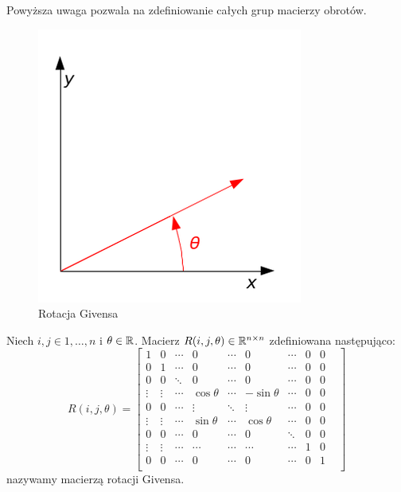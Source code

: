 \documentclass[12pt,a4paper]{report}
\newcommand{\mx}[1]{{#1}}
\begin{document}
Powyższa uwaga pozwala na zdefiniowanie całych grup macierzy obrotów.
\begin{figure}
\centering
\includegraphics[width=\linewidth]{rys/givens_rot.png}
\caption{Rotacja Givensa}\label{rys:logo:jeden}
\end{figure}

\begin{definition}
Niech $ i,j \in {1, \ldots, n}$ i $\theta \in \mathbb{R}$. Macierz $\mx{R}(i,j,\theta) \in \setR^{n\times n}$ zdefiniowana następująco:
$$
\mx{R}(i,j,\theta) = \begin{bmatrix}
1       & 0     & \cdots &    0       & \cdots &    0       & \cdots & 0 & 0& \\
0       & 1     & \cdots &     0      & \cdots &     0      &  \cdots& 0 & 0 &   \\
0       & 0     & \ddots &     0      &  \cdots&     0      &  \cdots& 0 & 0 &  \\
\vdots  &\vdots &  \cdots& \cos\theta & \cdots & -\sin\theta&  \cdots& 0 & 0& \\
0       &  0    & \cdots & \vdots     &  \ddots&  \vdots    & \cdots & 0 & 0& \\
\vdots  & \vdots& \cdots & \sin\theta & \cdots & \cos\theta &  \cdots& 0 & 0& \\
0       & 0     & \cdots &    0       &  \cdots&  0         & \ddots &  0& 0& \\
\vdots  & \vdots&\cdots  &  \cdots    &  \cdots&  \cdots    & \cdots & 1 & 0&\\
0       & 0     & \cdots &     0      &  \cdots&    0       &  \cdots& 0 & 1 & \\       
\end{bmatrix}
$$
nazywamy macierzą rotacji Givensa.
\end{definition}
\end{document}
